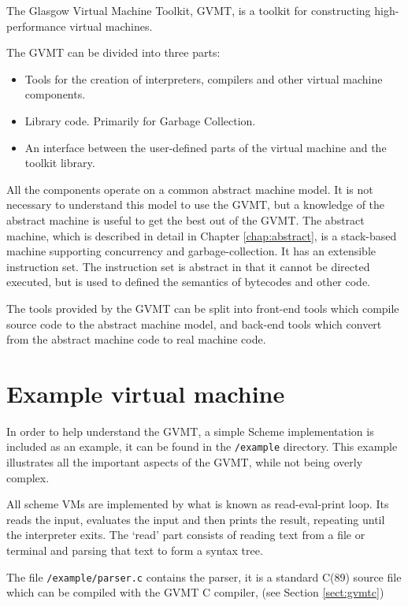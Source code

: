 The Glasgow Virtual Machine Toolkit, GVMT, is a toolkit for constructing high-performance virtual machines. 

The GVMT can be divided into three parts: \begin{itemize}
\item Tools for the creation of interpreters, compilers and other virtual machine components.
\item Library code. Primarily for Garbage Collection.
\item An interface between the user-defined parts of the virtual machine and the toolkit library.
\end{itemize}

All the components operate on a common abstract machine model. It is not necessary to understand this model to use the GVMT, but a knowledge of the abstract machine is useful to get the best out of the GVMT. The abstract machine, which is described in detail in Chapter \ref{chap:abstract}, is a stack-based machine supporting concurrency and garbage-collection. It has an extensible instruction set. The instruction set is abstract in that it cannot be directed executed, but is used to defined the semantics of bytecodes and other code. 

The tools provided by the GVMT can be split into front-end tools which compile source code to the abstract machine model, and back-end tools which convert from the abstract machine code to real machine code.


\section{Example virtual machine}

In order to help understand the GVMT, a simple Scheme implementation is included as an example, it can be found in the \verb|/example| directory. 
This example illustrates all the important aspects of the GVMT, while not being overly complex.

All scheme VMs are implemented by what is known as read-eval-print loop. Its reads the input, evaluates the input and then prints the result, repeating until the interpreter exits. 
The `read' part consists of reading text from a file or terminal and parsing that text to form a syntax tree.

The file \verb|/example/parser.c| contains the parser, it is a standard C(89) source file which can be compiled with the GVMT C compiler, \gvmtc (see Section \ref{sect:gvmtc})

